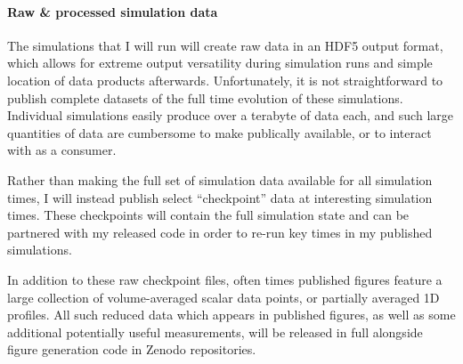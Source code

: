 \documentclass[11pt, preprint]{aastex}
\begin{document}
\vspace{-0.5cm}
\paragraph*{Raw \& processed simulation data}
The simulations that I will run will create raw data in an HDF5 output format, which allows for extreme output versatility during simulation runs and simple location of data products afterwards.
Unfortunately, it is not straightforward to publish complete datasets of the full time evolution of these simulations.
Individual simulations easily produce over a terabyte of data each, and such large quantities of data are cumbersome to make publically available, or to interact with as a consumer.

Rather than making the full set of simulation data available for all simulation times, I will instead publish select ``checkpoint'' data at interesting simulation times.
These checkpoints will contain the full simulation state and can be partnered with my released code in order to re-run key times in my published simulations.

In addition to these raw checkpoint files, often times published figures feature a large collection of volume-averaged scalar data points, or partially averaged 1D profiles.
All such reduced data which appears in published figures, as well as some additional potentially useful measurements, will be released in full alongside figure generation code in Zenodo repositories.
\end{document}
